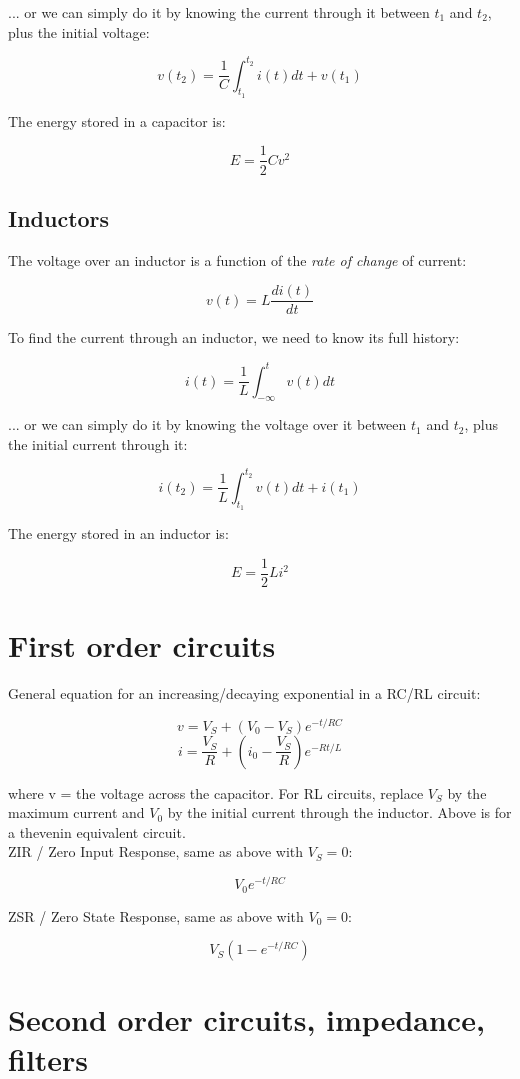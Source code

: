 ... or we can simply do it by knowing the current through it between $t_1$ and $t_2$, plus the initial voltage:

\[ v(t_2) = \frac{1}{C} \int_{t_1}^{t_2} i(t) dt + v(t_1) \]

The energy stored in a capacitor is:

\[ E = \frac{1}{2} C v^2 \]

\subsection{Inductors}

The voltage over an inductor is a function of the \emph{rate of change} of current:

\[ v(t) = L \frac{di(t)}{dt} \]

To find the current through an inductor, we need to know its full history:

\[ i(t) = \frac{1}{L} \int_{-\infty}^t v(t) dt \]

... or we can simply do it by knowing the voltage over it between $t_1$ and $t_2$, plus the initial current through it:

\[ i(t_2) = \frac{1}{L} \int_{t_1}^{t_2} v(t) dt + i(t_1) \]

The energy stored in an inductor is:

\[ E = \frac{1}{2} L i^2 \]

\section{First order circuits}

General equation for an increasing/decaying exponential in a RC/RL circuit:

\[ v = V_S + (V_0 - V_S) e^{-t/RC} \]
\[ i = \frac{V_S}{R} + (i_0 - \frac{V_S}{R}) e^{-Rt/L} \]

where v = the voltage across the capacitor. For RL circuits, replace $V_S$ by the maximum current and $V_0$ by the initial current through the inductor. Above is for a thevenin equivalent circuit.\\

ZIR / Zero Input Response, same as above with $V_S = 0$:

\[ V_0 e^{-t/RC} \]

ZSR / Zero State Response, same as above with $V_0 = 0$:

\[ V_S(1 - e^{-t/RC}) \]

\newpage

\section{Second order circuits, impedance, filters}

